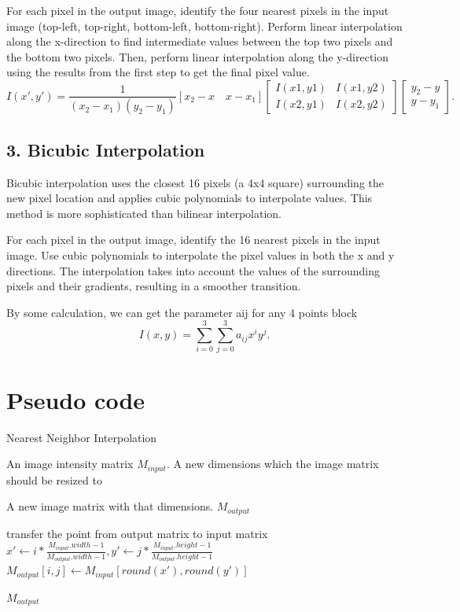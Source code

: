 \documentclass{article}
\begin{document}
For each pixel in the output image, identify the four nearest pixels in the input image (top-left, top-right, bottom-left, bottom-right).
Perform linear interpolation along the x-direction to find intermediate values between the top two pixels and the bottom two pixels.
Then, perform linear interpolation along the y-direction using the results from the first step to get the final pixel value.
$$I(x', y')=\frac{1}{(x_2-x_1)(y_2-y_1)}[x_2-x\quad x-x_1]\begin{bmatrix}I\left(x1,y1\right) & I(x1,y2)\\ I(x2,y1) & I(x2,y2)\end{bmatrix}\begin{bmatrix}y_2-y\\ y-y_1\end{bmatrix}.$$


\subsection*{3. Bicubic Interpolation}

Bicubic interpolation uses the closest 16 pixels (a 4x4 square) surrounding the new pixel location and applies cubic polynomials to interpolate values. This method is more sophisticated than bilinear interpolation.


For each pixel in the output image, identify the 16 nearest pixels in the input image.
Use cubic polynomials to interpolate the pixel values in both the x and y directions.
The interpolation takes into account the values of the surrounding pixels and their gradients, resulting in a smoother transition.

By some calculation, we can get the parameter aij for any 4 points block 
$$I(x,y)=\sum_{i=0}^3\sum_{j=0}^3a_{ij}x^{i}y^{j}.$$





\section*{Pseudo code}
\begin{algorithm}[h]
  \caption{Nearest Neighbor Interpolation}
  \begin{algorithmic}[1]
  \Require
      An image intensity matrix  $M_{input}$.
      A new dimensions which the image matrix should be resized to 
      
    \Ensure
      A new image matrix with that dimensions. $M_{output}$

      \State transfer the point from output matrix to input matrix $x' \gets i*\frac{M_{input}.width-1}{M_{output}.width-1},y' \gets j*\frac{M_{input}.height-1}{M_{output}.height-1}$ 
      \State $M_{output}[i,j] \gets M_{input}[round(x'),round(y')]$
    \EndFor
   \EndFor

   \Return $M_{output}$

        \label{code:recentEnd}
  \end{algorithmic}
\end{algorithm}
\end{document}
